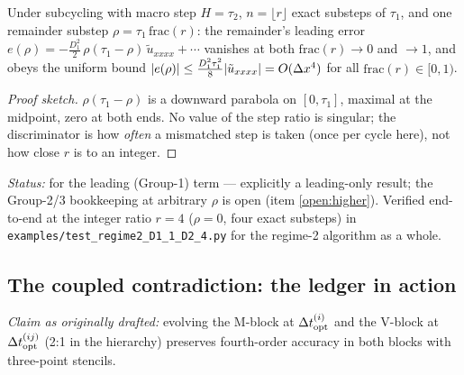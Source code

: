 \begin{theorem}\label{thm:remainder}
Under subcycling with macro step $H=\tau_2$, $n=\lfloor r\rfloor$ exact
substeps of $\tau_1$, and one remainder substep $\rho = \tau_1\,
\mathrm{frac}(r)$: the remainder's leading error
$e(\rho) = -\tfrac{D_1^2}2\,\rho(\tau_1-\rho)\,\tilde u_{xxxx}+\cdots$
vanishes at both $\mathrm{frac}(r)\to0$ and $\to1$, and obeys the uniform bound
$|e(\rho)| \le \tfrac{D_1^2\tau_1^2}8 |\tilde u_{xxxx}| = O(\Delta x^4)$ for all
$\mathrm{frac}(r)\in[0,1)$.
\end{theorem}
\begin{proof}[Proof sketch]
$\rho(\tau_1-\rho)$ is a downward parabola on $[0,\tau_1]$, maximal at the
midpoint, zero at both ends. No value of the step ratio is singular; the
discriminator is how \emph{often} a mismatched step is taken (once per cycle
here), not how close $r$ is to an integer.
\end{proof}
\noindent\emph{Status:} \tagP for the leading (Group-1) term --- explicitly a
leading-only result; the Group-2/3 bookkeeping at arbitrary $\rho$ is open
(item \ref{open:higher}). Verified end-to-end at the integer ratio $r=4$
($\rho=0$, four exact substeps) in \texttt{examples/test\_regime2\_D1\_1\_D2\_4.py}
\tagV for the regime-2 algorithm as a whole.

\subsection{The coupled contradiction: the ledger in action}

\begin{corollary}\label{cor:coupled}
\emph{Claim as originally drafted:} evolving the M-block at $\Delta t_{\mathrm{opt}}^{(i)}$ and the
V-block at $\Delta t_{\mathrm{opt}}^{(ij)}$ (2:1 in the hierarchy) preserves fourth-order accuracy
in both blocks with three-point stencils.
\end{corollary}

